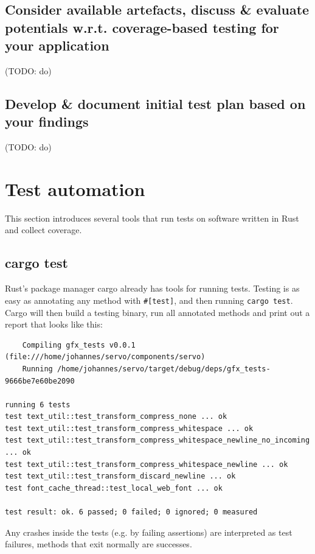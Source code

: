\documentclass{scrartcl}
\newcommand{\todo}[1] {{\color{red}(TODO: #1)}}
\begin{document}
\subsection{Consider available artefacts, discuss \& evaluate potentials w.r.t. coverage-based testing for your application}
\todo{do}


\subsection{Develop \& document initial test plan based on your findings}
\todo{do}


\newpage


\section{Test automation}

This section introduces several tools that run tests on software written in Rust and collect coverage.

\subsection{cargo test}

Rust's package manager cargo already has tools for running tests. Testing is as easy as annotating any method with \texttt{\#[test]}, and then running \texttt{cargo test}. Cargo will then build a testing binary, run all annotated methods and print out a report that looks like this:


\begin{verbatim}
    Compiling gfx_tests v0.0.1 (file:///home/johannes/servo/components/servo)
    Running /home/johannes/servo/target/debug/deps/gfx_tests-9666be7e60be2090

running 6 tests
test text_util::test_transform_compress_none ... ok
test text_util::test_transform_compress_whitespace ... ok
test text_util::test_transform_compress_whitespace_newline_no_incoming ... ok
test text_util::test_transform_compress_whitespace_newline ... ok
test text_util::test_transform_discard_newline ... ok
test font_cache_thread::test_local_web_font ... ok

test result: ok. 6 passed; 0 failed; 0 ignored; 0 measured

\end{verbatim}

Any crashes inside the tests (e.g. by failing assertions) are interpreted as test failures, methods that exit normally are successes.
\end{document}
